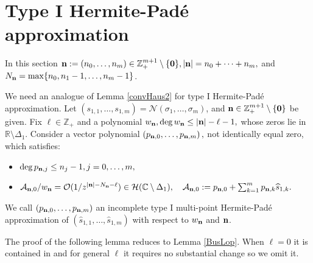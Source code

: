 \documentclass[10pt,a4paper]{article}
\theoremstyle{definition}
\theoremstyle{remark}
\numberwithin{equation}{section}
\begin{document}
\section{Type I Hermite-Pad\'e approximation}\label{CTI}

In this section ${\bf n} := (n_0,\ldots,n_m) \in \mathbb{Z}_+^{m+1} \setminus \{{\bf 0}\}, |{\bf n}| = n_0+\cdots+n_m,$ and $N_{\bf n} = \max\{n_0,n_1-1,\ldots,n_m-1\}$.

We need an analogue of Lemma \ref{convHaus2} for type I Hermite-Pad\'e approximation. Let $(s_{1,1},\ldots,s_{1,m}) = \mathcal{N}(\sigma_1,\ldots,\sigma_m)$, and ${\bf n} \in \mathbb{Z}_+^{m+1}  \setminus \{\bf 0\}$ be given.  Fix   $\ell \in \mathbb{Z}_+$ and  a polynomial $w_{\bf n}, \deg w_{\bf n} \leq |{\bf n}| -\ell-1,$ whose zeros lie in $\mathbb{R} \setminus\Delta_1$.  Consider a vector polynomial $\left(p_{{\bf n},0},\ldots, p_{{\bf n},m}\right),$ not  identically equal zero, which satisfies:
\begin{itemize}
\item[i')] $\deg p_{{\bf n},j} \leq n_j -1, j=0,\ldots,m,$
\item[ii')] $\mathcal{A}_{{\bf n},0}/w_{\bf n} = \mathcal{O}(1/z^{|{\bf n}|-N_{\bf n} -\ell}) \in \mathcal{H}(\mathbb{C} \setminus \Delta_1), \quad
    \mathcal{A}_{{\bf n},0} := p_{{\bf n},0} + \sum_{k= 1}^m p_{{\bf n},k} \widehat{s}_{1,k}.$

\end{itemize}
We call  $\left(p_{{\bf n},0},\ldots, p_{{\bf n},m}\right)$ an incomplete type I multi-point Hermite-Pad\'e  approximation of $(\widehat{s}_{1,1},\ldots,\widehat{s}_{1,m})$ with respect to $w_{\bf n}$ and $\bf n$.

The proof of the following lemma reduces to Lemma \ref{BusLop}. When $\ell = 0$ it is contained in \cite[Lemma 3.1]{LS} and for general $\ell$ it requires no substantial change so we omit it.
\end{document}
